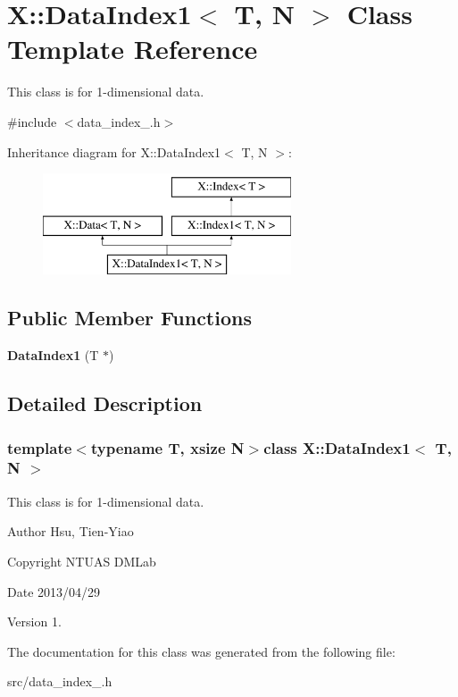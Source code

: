 \hypertarget{class_x_1_1_data_index1}{\section{X\-:\-:Data\-Index1$<$ T, N $>$ Class Template Reference}
\label{class_x_1_1_data_index1}
}


This class is for 1-\/dimensional data.  




{\ttfamily \#include $<$data\-\_\-index\-\_.\-h$>$}

Inheritance diagram for X\-:\-:Data\-Index1$<$ T, N $>$\-:\begin{figure}[H]
\begin{center}
\leavevmode
\includegraphics[height=3.000000cm]{class_x_1_1_data_index1}
\end{center}
\end{figure}
\subsection*{Public Member Functions}
\begin{DoxyCompactItemize}
\item 
\hypertarget{class_x_1_1_data_index1_a2943aafc09d6e22164a2ec424ecc326a}{{\bfseries Data\-Index1} (T $\ast$)}\label{class_x_1_1_data_index1_a2943aafc09d6e22164a2ec424ecc326a}

\end{DoxyCompactItemize}


\subsection{Detailed Description}
\subsubsection*{template$<$typename T, xsize N$>$class X\-::\-Data\-Index1$<$ T, N $>$}

This class is for 1-\/dimensional data. 

\begin{DoxyAuthor}{Author}
Hsu, Tien-\/\-Yiao 
\end{DoxyAuthor}
\begin{DoxyCopyright}{Copyright}
N\-T\-U\-A\-S D\-M\-Lab 
\end{DoxyCopyright}
\begin{DoxyDate}{Date}
2013/04/29 
\end{DoxyDate}
\begin{DoxyVersion}{Version}
1. 
\end{DoxyVersion}


The documentation for this class was generated from the following file\-:\begin{DoxyCompactItemize}
\item 
src/data\-\_\-index\-\_.\-h\end{DoxyCompactItemize}
